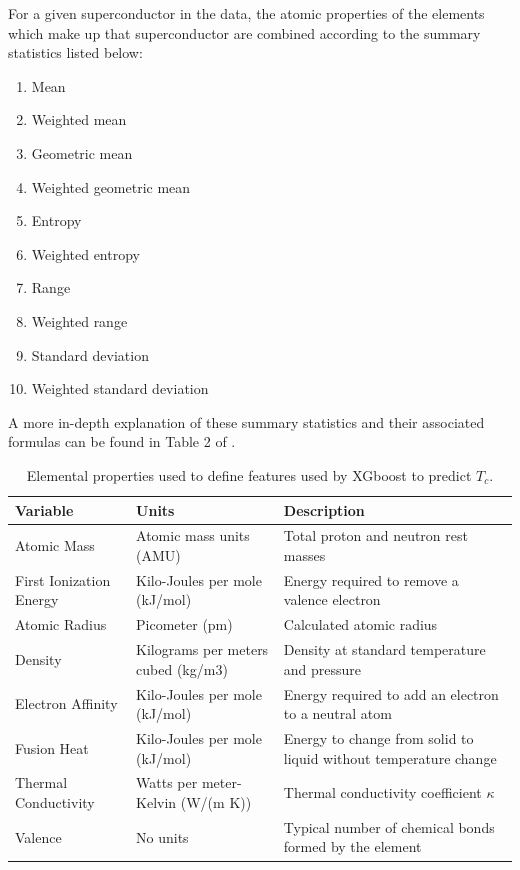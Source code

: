 \documentclass[oneside,12pt]{amsart}
\begin{document}
  For a given superconductor in the data, the atomic properties of the elements which make up that superconductor are combined according to the summary statistics listed below:
 \begin{enumerate}
     \item Mean
     \item Weighted mean
     \item Geometric mean
     \item Weighted geometric mean
     \item Entropy
     \item Weighted entropy
     \item Range
     \item Weighted range
     \item Standard deviation
     \item Weighted standard deviation
 \end{enumerate}
 
 A more in-depth explanation of these summary statistics and their associated formulas can be found in Table 2 of \cite{hamidieh_data-driven_2018}. 
 
 
 \begin{table}[ht]
     \centering
     \tiny
     \begin{tabularx}{\linewidth}{X X X}
          \hline
          Variable & Units & Description\\
          \hline
        Atomic Mass &Atomic mass units (AMU) &Total proton and neutron rest masses\\
        First Ionization Energy &Kilo-Joules per mole (kJ/mol)&Energy required to remove a valence electron\\
        Atomic Radius & Picometer (pm) &Calculated atomic radius\\
        Density&Kilograms per meters cubed (kg/m3)&Density at standard temperature and pressure\\
        Electron Affinity &Kilo-Joules per mole (kJ/mol) &Energy required to add an electron to a neutral atom\\
        Fusion Heat &Kilo-Joules per mole (kJ/mol) &Energy to change from solid to liquid without temperature change\\
        Thermal Conductivity &Watts per meter-Kelvin (W/(m K)) &Thermal conductivity coefficient $\kappa$\\
        Valence &No units &Typical number of chemical bonds formed by the element\\
        \hline
     \end{tabularx}
     \caption{Elemental properties used to define features used by XGboost to predict $T_c$. }
     \label{tab:elemental_properties}
 \end{table}
 
\end{document}
